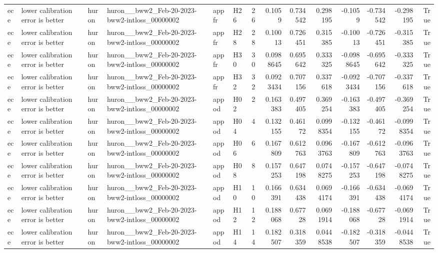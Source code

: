 \begin{longtable}{llllllrrrrrrrr}
ece & lower calibration error is better & huron & huron\_\_bww2\_Feb-20-2023-bww2-intloss\_00000002 & appfr & H26 & 26 & 0.1059 & 0.734542 & 0.298195 & -0.1059 & -0.734542 & -0.298195 & True \\
ece & lower calibration error is better & huron & huron\_\_bww2\_Feb-20-2023-bww2-intloss\_00000002 & appfr & H28 & 28 & 0.10013 & 0.726451 & 0.315385 & -0.10013 & -0.726451 & -0.315385 & True \\
ece & lower calibration error is better & huron & huron\_\_bww2\_Feb-20-2023-bww2-intloss\_00000002 & appfr & H30 & 30 & 0.0988645 & 0.695642 & 0.333325 & -0.0988645 & -0.695642 & -0.333325 & True \\
ece & lower calibration error is better & huron & huron\_\_bww2\_Feb-20-2023-bww2-intloss\_00000002 & appfr & H32 & 32 & 0.0923434 & 0.707156 & 0.337618 & -0.0923434 & -0.707156 & -0.337618 & True \\
ece & lower calibration error is better & huron & huron\_\_bww2\_Feb-20-2023-bww2-intloss\_00000002 & appod & H02 & 2 & 0.163383 & 0.497405 & 0.369254 & -0.163383 & -0.497405 & -0.369254 & True \\
ece & lower calibration error is better & huron & huron\_\_bww2\_Feb-20-2023-bww2-intloss\_00000002 & appod & H04 & 4 & 0.132155 & 0.46172 & 0.0998354 & -0.132155 & -0.46172 & -0.0998354 & True \\
ece & lower calibration error is better & huron & huron\_\_bww2\_Feb-20-2023-bww2-intloss\_00000002 & appod & H06 & 6 & 0.167809 & 0.612763 & 0.0963763 & -0.167809 & -0.612763 & -0.0963763 & True \\
ece & lower calibration error is better & huron & huron\_\_bww2\_Feb-20-2023-bww2-intloss\_00000002 & appod & H08 & 8 & 0.157253 & 0.647198 & 0.0748275 & -0.157253 & -0.647198 & -0.0748275 & True \\
ece & lower calibration error is better & huron & huron\_\_bww2\_Feb-20-2023-bww2-intloss\_00000002 & appod & H10 & 10 & 0.166391 & 0.634438 & 0.0694174 & -0.166391 & -0.634438 & -0.0694174 & True \\
ece & lower calibration error is better & huron & huron\_\_bww2\_Feb-20-2023-bww2-intloss\_00000002 & appod & H12 & 12 & 0.188068 & 0.67728 & 0.0691914 & -0.188068 & -0.67728 & -0.0691914 & True \\
ece & lower calibration error is better & huron & huron\_\_bww2\_Feb-20-2023-bww2-intloss\_00000002 & appod & H14 & 14 & 0.182507 & 0.318359 & 0.0448538 & -0.182507 & -0.318359 & -0.0448538 & True \\

\end{longtable}
